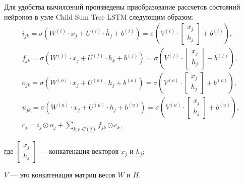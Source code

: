 Для удобства вычилсений произведены приобразование рассчетов состояний нейронов в узле Child Sum Tree LSTM следующим образом:
\begin{gather}
  \label{eq:func:lstm:i}
  i_{jk} = \sigma(W^{(i)}\cdot{x_j} + U^{(i)}\cdot{\tilde{h_j}} + b^{(i)}) = \sigma({V^{(i)}\cdot{
      \begin{bmatrix}
        x_j\\
        h_j
      \end{bmatrix}} + b^{(i)}}),\\
  \label{eq:func:lstm:forget}
  f_{jk} = \sigma(W^{(f)}\cdot{x_j} + U^{(f)}\cdot{h_k} + b^{(f)}) = \sigma({V^{(f)}\cdot{
      \begin{bmatrix}
        x_j\\
        h_j
      \end{bmatrix}} + b^{(f)}}),\\
  \label{eq:func:lstm:o}
  o_{jk} = \sigma(W^{(o)}\cdot{x_j} + U^{(o)}\cdot{h_j} + b^{(o)}) = \sigma({V^{(o)}\cdot{
      \begin{bmatrix}
        x_j\\
        h_j
      \end{bmatrix}} + b^{(o)}}),\\
  \label{eq:func:lstm:u}
  u_{jk} = \sigma(W^{(u)}\cdot{x_j} + U^{(u)}\cdot{h_j} + b^{(u)}) = \sigma({V^{(u)}\cdot{
      \begin{bmatrix}
        x_j\\
        h_j
      \end{bmatrix}} + b^{(u)}}),\\
  \label{eq:func:lstm:transform}
  c_j = i_j\odot{u_j} + \sum_{k\in{C(j)}}f_{jk}\odot{c_k},
\end{gather}
\begin{explanationx}
\item [где]       $\begin{bmatrix}x_j\\h_j\end{bmatrix}$ --- конкатенация векторов $x_j$ и $h_j$;
\item $V$ --- это конкатенация матриц весов $W$ и $H$.
\end{explanationx}

